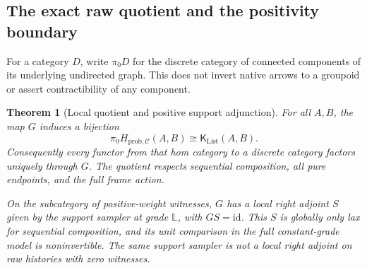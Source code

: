\documentclass[11pt,a4paper]{article}
\newtheorem{theorem}{Theorem}[section]
\theoremstyle{definition}
\newcommand{\C}{\mathcal C}
\newcommand{\id}{\mathrm{id}}
\newcommand{\List}{\operatorname{List}}
\begin{document}
\subsection{The exact raw quotient and the positivity boundary}
For a category $D$, write $\pi_0D$ for the discrete category of connected
components of its underlying undirected graph. This does not invert native
arrows to a groupoid or assert contractibility of any component.

\begin{theorem}[Local quotient and positive support adjunction]\label{thm:quotient}
For all $A,B$, the map $G$ induces a bijection
\[
 \pi_0 H_{\mathrm{prob},\C}(A,B)
       \cong\mathsf K_{\List}(A,B).
\]
Consequently every functor from that hom category to a discrete category
factors uniquely through $G$. The quotient respects sequential composition,
all pure endpoints, and the full frame action.

On the subcategory of positive-weight witnesses, $G$ has a local right
adjoint $S$ given by the support sampler at grade $\mathbb L$, with $GS=\id$.
This $S$ is globally only lax for sequential composition, and its unit
comparison in the full constant-grade model is noninvertible. The same
support sampler is not a local right adjoint on raw histories with zero
witnesses.
\end{theorem}
\end{document}
